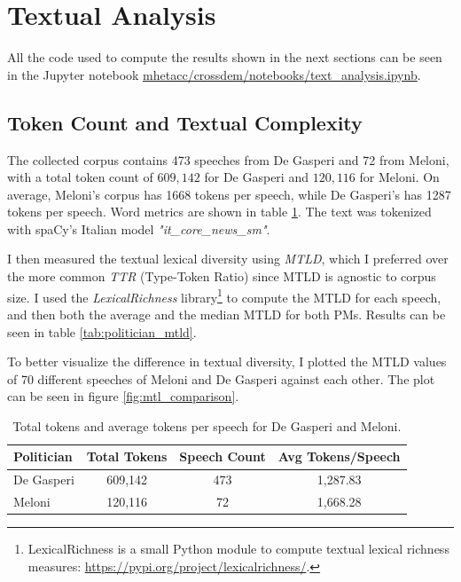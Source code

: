 \section{Textual Analysis}

All the code used to compute the results shown in the next sections can be seen in the Jupyter notebook \href{https://github.com/mhetacc/crossdem/blob/8645cc832df6ead9163506777cc995e2d70f5bd1/notebooks/text_analysis.ipynb}{mhetacc/crossdem/notebooks/text\_analysis.ipynb}.


\subsection{Token Count and Textual Complexity}

The collected corpus contains 473 speeches from De Gasperi and 72 from Meloni, with a total token count of $609,142$ for De Gasperi and $120,116$ for Meloni.
On average, Meloni's corpus has 1668 tokens per speech, while De Gasperi's has 1287 tokens per speech. Word metrics are shown in table \ref{tab:politician_tokens}.
The text was tokenized with spaCy's Italian model \textit{"it\_core\_news\_sm"}.

I then measured the textual lexical diversity using \textit{MTLD}, which I preferred over the more common \textit{TTR} (Type-Token Ratio) since MTLD is agnostic to corpus size. I used the \textit{LexicalRichness} library\footnote{LexicalRichness is a small Python module to compute textual lexical richness measures: \url{https://pypi.org/project/lexicalrichness/}.} to compute the MTLD for each speech, and then both the average and the median MTLD for both PMs. Results can be seen in table \ref{tab:politician_mtld}.

To better visualize the difference in textual diversity, I plotted the MTLD values of 70 different speeches of Meloni and De Gasperi against each other. The plot can be seen in figure \ref{fig:mtl_comparison}.


\begin{table}[h]
    \centering
    \caption{Total tokens and average tokens per speech for De Gasperi and Meloni.}
    \label{tab:politician_tokens}
    \begin{tabular}{lccc}
        \toprule
        \textbf{Politician} & \textbf{Total Tokens} & \textbf{Speech Count} & \textbf{Avg Tokens/Speech} \\
        \midrule
        De Gasperi           & 609,142               & 473                   & 1,287.83                   \\
        Meloni              & 120,116               & 72                    & 1,668.28                   \\
        \bottomrule
    \end{tabular}
\end{table}


